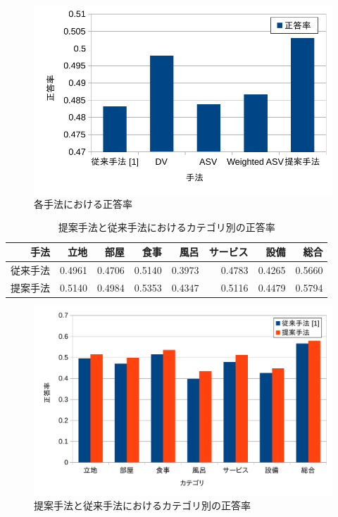 \begin{figure}
  \includegraphics{fig/graph_of_accuracies_of_methods.pdf}
  \caption{各手法における正答率}
  \label{fig:AccuraciesOfMethods}
\end{figure}

\begin{table}
  \caption{提案手法と従来手法\cite{fujitani15}におけるカテゴリ別の正答率}
  \centering
  \begin{tabular}{r | r r r r r r r} \label{tab:AccuraciesPerCategory}
    手法 & 立地 & 部屋 & 食事 & 風呂 & サービス & 設備 & 総合 \\
    \hline
    従来手法\cite{fujitani15}
        & 0.4961 & 0.4706 & 0.5140 & 0.3973 & 0.4783 & 0.4265 & 0.5660 \\
    提案手法 & 0.5140 & 0.4984 & 0.5353 & 0.4347 & 0.5116 & 0.4479 & 0.5794 \\
  \end{tabular}
\end{table}

\begin{figure}
  \includegraphics{fig/graph_of_accuracies_per_category.pdf}
  \caption{提案手法と従来手法\cite{fujitani15}におけるカテゴリ別の正答率}
  \label{fig:AccuraciesPerCategory}
\end{figure}

